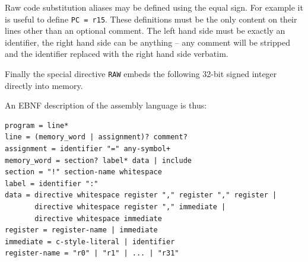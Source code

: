 \documentclass{article}
\begin{document}
Raw code substitution aliases may be defined using the equal sign. For example
it is useful to define \texttt{PC = r15}. These definitions must be the only
content on their lines other than an optional comment. The left hand side must
be exactly an identifier, the right hand side can be anything -- any comment
will be stripped and the identifier replaced with the right hand side verbatim.

Finally the special directive \texttt{RAW} embeds the following 32-bit signed
integer directly into memory.

An EBNF description of the assembly language is thus:

\begin{verbatim}program = line*
line = (memory_word | assignment)? comment?
assignment = identifier "=" any-symbol+
memory_word = section? label* data | include
section = "!" section-name whitespace
label = identifier ":"
data = directive whitespace register "," register "," register |
       directive whitespace register "," immediate |
       directive whitespace immediate
register = register-name | immediate
immediate = c-style-literal | identifier
register-name = "r0" | "r1" | ... | "r31"
\end{verbatim}
\end{document}
